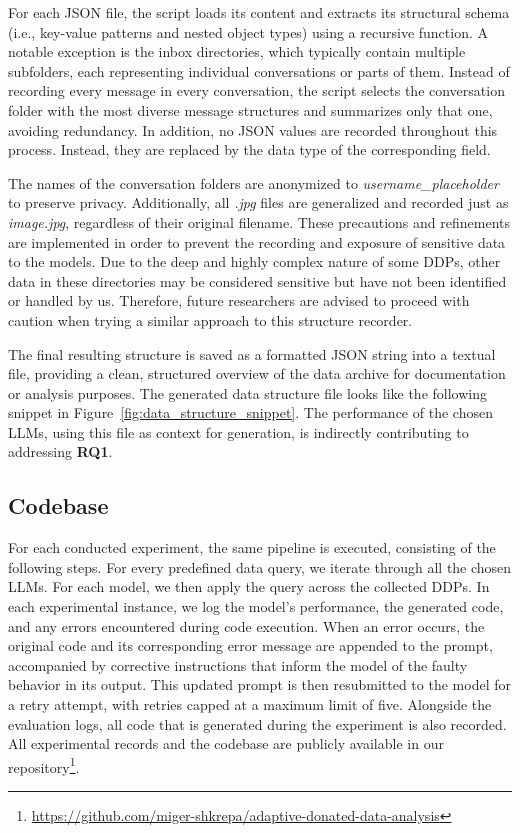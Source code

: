 \documentclass{DESSThesis}
\begin{document}
For each JSON file, the script loads its content and extracts its structural schema (i.e., key-value patterns and nested object types) using a recursive function. A notable exception is the inbox directories, which typically contain multiple subfolders, each representing individual conversations or parts of them. Instead of recording every message in every conversation, the script selects the conversation folder with the most diverse message structures and summarizes only that one, avoiding redundancy. In addition, no JSON values are recorded throughout this process. Instead, they are replaced by the data type of the corresponding field.

The names of the conversation folders are anonymized to \emph{username\_placeholder} to preserve privacy. Additionally, all \emph{.jpg} files are generalized and recorded just as \emph{image.jpg}, regardless of their original filename. These precautions and refinements are implemented in order to prevent the recording and exposure of sensitive data to the models. Due to the deep and highly complex nature of some DDPs, other data in these directories may be considered sensitive but have not been identified or handled by us. Therefore, future researchers are advised to proceed with caution when trying a similar approach to this structure recorder.

The final resulting structure is saved as a formatted JSON string into a textual file, providing a clean, structured overview of the data archive for documentation or analysis purposes. The generated data structure file looks like the following snippet in Figure~\ref{fig:data_structure_snippet}. The performance of the chosen LLMs, using this file as context for generation, is indirectly contributing to addressing \textbf{RQ1}.

\subsection{Codebase}

For each conducted experiment, the same pipeline is executed, consisting of the following steps. For every predefined data query, we iterate through all the chosen LLMs. For each model, we then apply the query across the collected DDPs. In each experimental instance, we log the model's performance, the generated code, and any errors encountered during code execution. When an error occurs, the original code and its corresponding error message are appended to the prompt, accompanied by corrective instructions that inform the model of the faulty behavior in its output. This updated prompt is then resubmitted to the model for a retry attempt, with retries capped at a maximum limit of five. Alongside the evaluation logs, all code that is generated during the experiment is also recorded. All experimental records and the codebase are publicly available in our repository\footnote{\url{https://github.com/miger-shkrepa/adaptive-donated-data-analysis}}.
\end{document}

